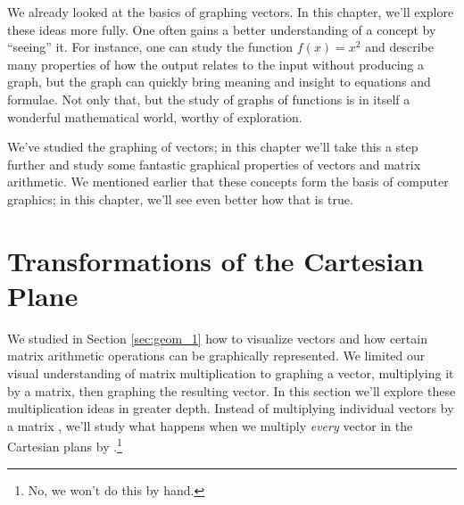 We already looked at the basics of graphing vectors. In this chapter, we'll explore these ideas more fully. One often gains a better understanding of a concept by ``seeing'' it. For instance, one can study the function $f(x)=x^2$ and describe many properties of how the output relates to the input without producing a graph, but the graph can quickly bring meaning and insight to equations and formulae. Not only that, but the study of graphs of functions is in itself a wonderful mathematical world, worthy of exploration.

We've studied the graphing of vectors; in this chapter we'll take this a step further and study some fantastic graphical properties of vectors and matrix arithmetic. We mentioned earlier that these concepts form the basis of computer graphics; in this chapter, we'll see even better how that is true.

\section{Transformations of the Cartesian Plane}\label{sec:geom_3}


We studied in Section \ref{sec:geom_1} how to visualize vectors and how certain matrix arithmetic operations can be graphically represented. We limited our visual understanding of matrix  multiplication to graphing a vector, multiplying it by a matrix, then graphing the resulting vector. In this section we'll explore these multiplication ideas in greater depth. Instead of multiplying individual vectors by a matrix \tta, we'll study what happens when we multiply \textit{every} vector in the Cartesian plans by \tta.\footnote{No, we won't do this by hand.} \\

